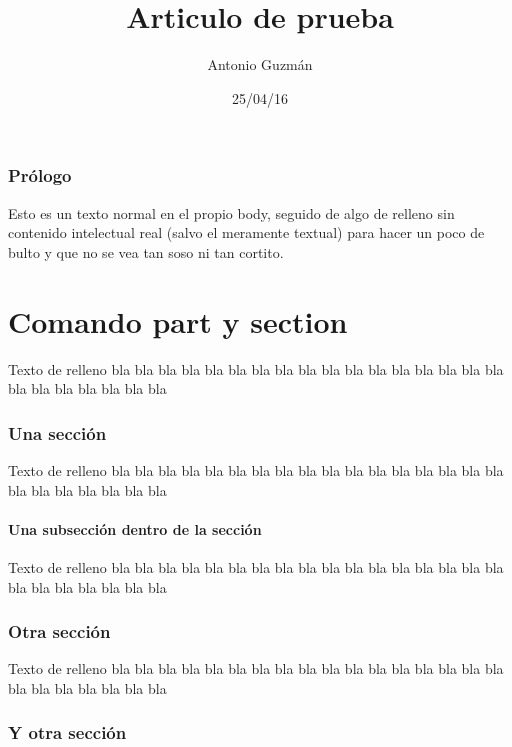 \documentclass[a4paper,11pt]{article}
\begin{document}
  \title{Articulo de prueba}

  \author{Antonio Guzmán}

  \date{25/04/16}
\maketitle%
\tableofcontents %
\section{Prólogo}
Esto es un texto normal en el propio body, seguido de algo de relleno sin contenido intelectual real (salvo el meramente textual)
 para hacer un poco de bulto y que no se vea tan soso ni tan cortito.
\part{Comando part y section} %

Texto de relleno bla bla bla bla bla bla bla bla bla bla bla bla bla bla bla bla bla bla bla bla bla bla bla bla

\section{Una sección}%

Texto de relleno bla bla bla bla bla bla bla bla bla bla bla bla bla bla bla bla bla bla bla bla bla bla bla bla

\subsection{Una subsección dentro de la sección}%

Texto de relleno bla bla bla bla bla bla bla bla bla bla bla bla bla bla bla bla bla bla bla bla bla bla bla bla

\section{Otra sección}

Texto de relleno bla bla bla bla bla bla bla bla bla bla bla bla bla bla bla bla bla bla bla bla bla bla bla bla

\section{Y otra sección}
\end{document}
